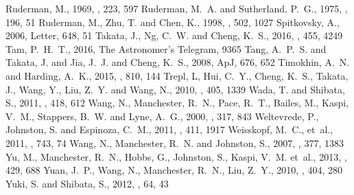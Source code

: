 \documentclass[12pt,preprint]{aastex}
\begin{document}
\begin{thebibliography}{}
  {Ruderman}, M., 1969, \nat, 223, 597
  {Ruderman}, M.~A. and {Sutherland}, P.~G., 1975, \apj, 196, 51
  {Ruderman}, M., {Zhu}, T. and {Chen}, K., 1998, \apj, 502, 1027
  {Spitkovsky}, A., 2006, \apj Letter, 648, 51
  {Takata}, J., {Ng}, C.~W. and {Cheng}, K.~S., 2016, \mnras, 455, 4249
  {Tam}, P.~H.~T., 2016, The Astronomer's Telegram, 9365
  {Tang}, A.~P.~S. and {Takata}, J. and {Jia}, J.~J. and {Cheng}, K.~S., 2008, ApJ, 676, 652
  {Timokhin}, A.~N. and {Harding}, A.~K., 2015, \apj, 810, 144
  {Trepl}, L, {Hui}, C.~Y., {Cheng}, K.~S., {Takata}, J.,
  {Wang}, Y., {Liu}, Z.~Y. and {Wang}, N., 2010, \mnras, 405, 1339
  {Wada}, T. and {Shibata}, S., 2011, \mnras, 418, 612
  {Wang}, N., {Manchester}, R.~N., {Pace}, R.~T., {Bailes}, M.,
  {Kaspi}, V.~M., {Stappers}, B.~W. and {Lyne}, A.~G., 2000, \mnras, 317, 843
  {Weltevrede}, P., {Johnston}, S. and {Espinoza}, C.~M., 2011, \mnras, 411, 1917
  {Weisskopf}, M.~C., {et~al.}, 2011, \apj, 743, 74
  {Wang}, N.,  {Manchester}, R.~N. and {Johnston}, S., 2007, \mnras, 377, 1383
  {Yu}, M., {Manchester}, R.~N.,  {Hobbs}, G., {Johnston}, S.,  {Kaspi}, V.~M. {et~al.},
  2013, \mnras, 429, 688
  {Yuan}, J.~P., {Wang}, N., {Manchester}, R.~N., {Liu}, Z.~Y., 2010, \mnras, 404, 280
  {Yuki}, S. and {Shibata}, S., 2012, \pasj, 64, 43
\end{thebibliography}
\end{document}
